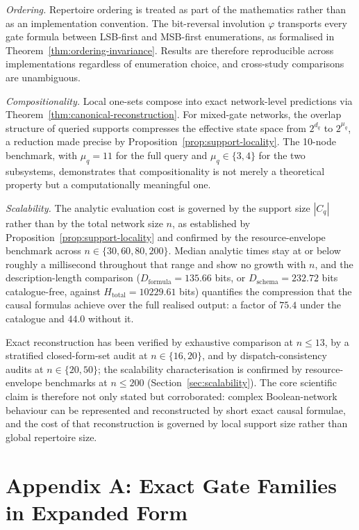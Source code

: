 \documentclass[11pt]{article}
\theoremstyle{definition}
\begin{document}
\emph{Ordering.} Repertoire ordering is treated as part of the mathematics rather than as an implementation convention. The bit-reversal involution \(\varphi\) transports every gate formula between LSB-first and MSB-first enumerations, as formalised in Theorem~\ref{thm:ordering-invariance}. Results are therefore reproducible across implementations regardless of enumeration choice, and cross-study comparisons are unambiguous.

\emph{Compositionality.} Local one-sets compose into exact network-level predictions via Theorem~\ref{thm:canonical-reconstruction}. For mixed-gate networks, the overlap structure of queried supports compresses the effective state space from \(2^{d_q}\) to \(2^{\mu_q}\), a reduction made precise by Proposition~\ref{prop:support-locality}. The 10-node benchmark, with \(\mu_q=11\) for the full query and \(\mu_q\in\{3,4\}\) for the two subsystems, demonstrates that compositionality is not merely a theoretical property but a computationally meaningful one.

\emph{Scalability.} The analytic evaluation cost is governed by the support size \(|C_q|\) rather than by the total network size \(n\), as established by Proposition~\ref{prop:support-locality} and confirmed by the resource-envelope benchmark across \(n\in\{30,60,80,200\}\). Median analytic times stay at or below roughly a millisecond throughout that range and show no growth with \(n\), and the description-length comparison (\(D_{\mathrm{formula}}=135.66\) bits, or \(D_{\mathrm{schema}}=232.72\) bits catalogue-free, against \(H_{\mathrm{total}}=10229.61\) bits) quantifies the compression that the causal formulas achieve over the full realised output: a factor of \(75.4\) under the catalogue and \(44.0\) without it.

Exact reconstruction has been verified by exhaustive comparison at $n\leq 13$, by a stratified closed-form-set audit at $n\in\{16,20\}$, and by dispatch-consistency audits at $n\in\{20,50\}$; the scalability characterisation is confirmed by resource-envelope benchmarks at $n\leq 200$ (Section~\ref{sec:scalability}). The core scientific claim is therefore not only stated but corroborated: complex Boolean-network behaviour can be represented and reconstructed by short exact causal formulae, and the cost of that reconstruction is governed by local support size rather than global repertoire size.

\appendix

\section{Appendix A: Exact Gate Families in Expanded Form}
\end{document}
